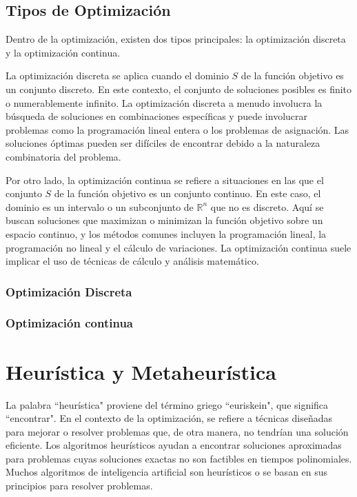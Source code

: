 \documentclass[12pt,titlepage,twoside,openright]{book}
\begin{document}
\subsection{Tipos de Optimizaci\'on}

Dentro de la optimizaci\'on, existen dos tipos principales: la optimizaci\'on discreta y la optimizaci\'on continua.

La optimizaci\'on discreta se aplica cuando el dominio \( S \) de la funci\'on objetivo es un conjunto discreto. En este contexto, el conjunto de soluciones posibles es finito o numerablemente infinito. La optimizaci\'on discreta a menudo involucra la b\'usqueda de soluciones en combinaciones espec\'ificas y puede involucrar problemas como la programaci\'on lineal entera o los problemas de asignaci\'on. Las soluciones \'optimas pueden ser dif\'iciles de encontrar debido a la naturaleza combinatoria del problema.

Por otro lado, la optimizaci\'on continua se refiere a situaciones en las que el conjunto \( S \) de la funci\'on objetivo es un conjunto continuo. En este caso, el dominio es un intervalo o un subconjunto de \( \mathbb{R}^n \) que no es discreto. Aqu\'i se buscan soluciones que maximizan o minimizan la funci\'on objetivo sobre un espacio continuo, y los m\'etodos comunes incluyen la programaci\'on lineal, la programaci\'on no lineal y el c\'alculo de variaciones. La optimizaci\'on continua suele implicar el uso de t\'ecnicas de c\'alculo y an\'alisis matem\'atico.

\subsubsection{Optimizaci\'on Discreta}

\subsubsection{Optimizaci\'on continua}

\section{Heur\'istica y Metaheur\'istica}

La palabra ``heur\'istica" proviene del t\'ermino griego ``euriskein", que significa ``encontrar".
En el contexto de la optimizaci\'on, se refiere a t\'ecnicas dise\~nadas para mejorar o resolver problemas que, de otra manera, no tendr\'ian una soluci\'on eficiente. Los algoritmos heur\'isticos ayudan a encontrar soluciones aproximadas para problemas cuyas soluciones exactas no son factibles en tiempos polinomiales.
Muchos algoritmos de inteligencia artificial son heur\'isticos o se basan en sus principios para resolver problemas.
\end{document}
